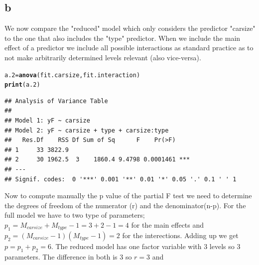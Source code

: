 \documentclass{article}\usepackage[]{graphicx}\usepackage[]{color}
\makeatletter
\newcommand{\hlstd}[1]{\textcolor[rgb]{0.345,0.345,0.345}{#1}}%
\newcommand{\hlkwb}[1]{\textcolor[rgb]{0.69,0.353,0.396}{#1}}%
\newcommand{\hlkwd}[1]{\textcolor[rgb]{0.737,0.353,0.396}{\textbf{#1}}}%
\newenvironment{kframe}{%
 \def\at@end@of@kframe{}%
 \ifinner\ifhmode%
  \def\at@end@of@kframe{\end{minipage}}%
  \begin{minipage}{\columnwidth}%
 \fi\fi%
 \def\FrameCommand##1{\hskip\@totalleftmargin \hskip-\fboxsep
 \colorbox{shadecolor}{##1}\hskip-\fboxsep
     \hskip-\linewidth \hskip-\@totalleftmargin \hskip\columnwidth}%
 \MakeFramed {\advance\hsize-\width
   \@totalleftmargin\z@ \linewidth\hsize
   \@setminipage}}%
 {\par\unskip\endMakeFramed%
 \at@end@of@kframe}
\newenvironment{knitrout}{}{} %
\makeatother
\begin{document}
\subsection*{b}
We now compare the "reduced" model which only considers the predictor "carsize" to the one that also includes the "type" predictor. When we include the main effect of a predictor we include all possible interactions as standard practice as to not make arbitrarily determined levels relevant (also vice-versa).
\begin{knitrout}
\color{fgcolor}\begin{kframe}
\begin{alltt}
\hlstd{a.2} \hlkwb{=} \hlkwd{anova}\hlstd{(fit.carsize,fit.interaction)}
\hlkwd{print}\hlstd{(a.2)}
\end{alltt}
\begin{verbatim}
## Analysis of Variance Table
## 
## Model 1: yF ~ carsize
## Model 2: yF ~ carsize + type + carsize:type
##   Res.Df    RSS Df Sum of Sq      F    Pr(>F)    
## 1     33 3822.9                                  
## 2     30 1962.5  3    1860.4 9.4798 0.0001461 ***
## ---
## Signif. codes:  0 '***' 0.001 '**' 0.01 '*' 0.05 '.' 0.1 ' ' 1
\end{verbatim}
\end{kframe}
\end{knitrout}
Now to compute manually the p value of the partial F test we need to determine the degrees of freedom of the numerator (r) and the denominator(n-p). For the full model we have to two type of parameters; $p_1 =M_{carsize} + M_{type} - 1 = 3 + 2 - 1 = 4$ for the main effects and $p_2 = (M_{carsize} -1) (M_{type} - 1) = 2$ for the interections. Adding up we get $p = p_1 + p_2 = 6$. The reduced model has one factor variable with 3 levels so 3 parameters. The difference in both is 3 so $r = 3$ and 
\end{document}
